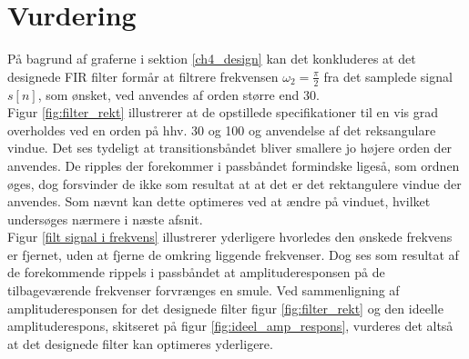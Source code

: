 \section{Vurdering}
På bagrund af graferne i sektion \ref{ch4_design} kan det konkluderes at det designede FIR filter formår at filtrere frekvensen $\omega_2=\frac{\pi}{2}$ fra det samplede signal $s[n]$, som ønsket, ved anvendes af orden større end $30$.\\
Figur \ref{fig:filter_rekt} illustrerer at de opstillede specifikationer til en vis grad overholdes ved en orden på hhv. 30 og 100 og anvendelse af det reksangulare vindue. Det ses tydeligt at transitionsbåndet bliver smallere jo højere orden der anvendes. De ripples der forekommer i passbåndet formindske ligeså, som ordnen øges, dog forsvinder de ikke som resultat at at det er det rektangulere vindue der anvendes. Som nævnt kan dette optimeres ved at ændre på vinduet, hvilket undersøges nærmere i næste afsnit. \\
Figur \ref{filt signal i frekvens} illustrerer yderligere hvorledes den ønskede frekvens er fjernet, uden at fjerne de omkring liggende frekvenser. Dog ses som resultat af de forekommende  rippels i passbåndet at amplituderesponsen på de tilbageværende frekvenser forvrænges en smule.    
Ved sammenligning af amplituderesponsen for det designede filter figur \ref{fig:filter_rekt} og den ideelle amplituderespons, skitseret på figur \ref{fig:ideel_amp_respons}, vurderes det altså at det designede filter kan optimeres yderligere. \\